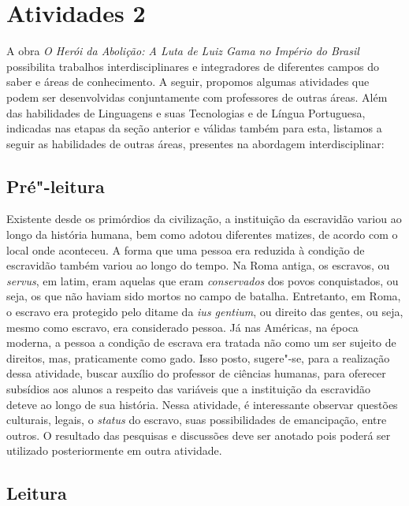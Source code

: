 \documentclass[12pt]{extarticle}
\begin{document}
\section{Atividades 2}

A obra \emph{O Herói da Abolição: A Luta de Luiz Gama no Império do
Brasil} possibilita trabalhos interdisciplinares e integradores de
diferentes campos do saber e áreas de conhecimento. A seguir, propomos
algumas atividades que podem ser desenvolvidas conjuntamente com
professores de outras áreas. Além das habilidades de Linguagens e suas
Tecnologias e de Língua Portuguesa, indicadas nas etapas da seção
anterior e válidas também para esta, listamos a seguir as habilidades de
outras áreas, presentes na abordagem interdisciplinar:


\subsection{Pré"-leitura}

Existente desde os primórdios da civilização, a instituição
da escravidão variou ao longo da história humana, bem como adotou
diferentes matizes, de acordo com o local onde aconteceu. A forma que
uma pessoa era reduzida à condição de escravidão também variou ao longo
do tempo. Na Roma antiga, os escravos, ou \emph{servus}, em latim, eram
aquelas que eram \emph{conservados} dos povos conquistados, ou seja, os
que não haviam sido mortos no campo de batalha. Entretanto, em Roma, o
escravo era protegido pelo ditame da \emph{ius gentium}, ou direito das
gentes, ou seja, mesmo como escravo, era considerado pessoa. Já nas
Américas, na época moderna, a pessoa a condição de escrava era tratada
não como um ser sujeito de direitos, mas, praticamente como gado. Isso
posto, sugere"-se, para a realização dessa atividade, buscar auxílio do
professor de ciências humanas, para oferecer subsídios aos alunos a
respeito das variáveis que a instituição da escravidão deteve ao longo
de sua história. Nessa atividade, é interessante observar questões
culturais, legais, o \emph{status} do escravo, suas possibilidades de
emancipação, entre outros. O resultado das pesquisas e discussões deve
ser anotado pois poderá ser utilizado posteriormente em outra atividade.

\subsection{Leitura}
\end{document}
